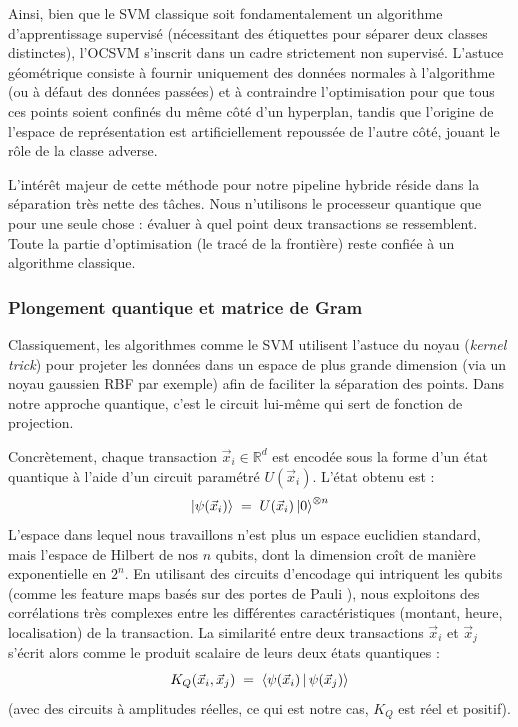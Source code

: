 \documentclass[a4paper]{article}
\begin{document}
Ainsi, bien que le SVM classique soit fondamentalement un algorithme d'apprentissage supervisé (nécessitant des étiquettes pour séparer deux classes distinctes), l'OCSVM s'inscrit dans un cadre strictement non supervisé. L'astuce géométrique consiste à fournir uniquement des données normales à l'algorithme (ou à défaut des données passées) et à contraindre l'optimisation pour que tous ces points soient confinés du même côté d'un hyperplan, tandis que l'origine de l'espace de représentation est artificiellement repoussée de l'autre côté, jouant le rôle de la classe adverse.

L'intérêt majeur de cette méthode pour notre pipeline hybride réside dans la séparation très nette des tâches. Nous n'utilisons le processeur quantique que pour une seule chose : évaluer à quel point deux transactions se ressemblent. Toute la partie d'optimisation (le tracé de la frontière) reste confiée à un algorithme classique. 

\subsubsection*{Plongement quantique et matrice de Gram}

Classiquement, les algorithmes comme le SVM utilisent l'astuce du noyau (\emph{kernel trick}) pour projeter les données dans un espace de plus grande dimension (via un noyau gaussien RBF par exemple) afin de faciliter la séparation des points. Dans notre approche quantique, c'est le circuit lui-même qui sert de fonction de projection. 

Concrètement, chaque transaction $\vec{x}_i \in \mathbb{R}^d$ est encodée sous la forme d'un état quantique à l'aide d'un circuit paramétré $U(\vec{x}_i)$. L'état obtenu est :
\[
\ket{\psi(\vec{x}_i)} \;=\; U(\vec{x}_i)\ket{0}^{\otimes n}
\]
L'espace dans lequel nous travaillons n'est plus un espace euclidien standard, mais l'espace de Hilbert de nos $n$ qubits, dont la dimension croît de manière exponentielle en $2^n$. En utilisant des circuits d'encodage qui intriquent les qubits (comme les feature maps basés sur des portes de Pauli \cite{havlicek2019}), nous exploitons des corrélations très complexes entre les différentes caractéristiques (montant, heure, localisation) de la transaction. La similarité entre deux transactions $\vec{x}_i$ et $\vec{x}_j$ s'écrit alors comme le produit scalaire de leurs deux états quantiques :
\[
K_Q(\vec{x}_i, \vec{x}_j) \;=\; \braket{\psi(\vec{x}_i)\,|\,\psi(\vec{x}_j)}
\]
(avec des circuits à amplitudes réelles, ce qui est notre cas, $K_Q$ est réel et positif).
\end{document}
